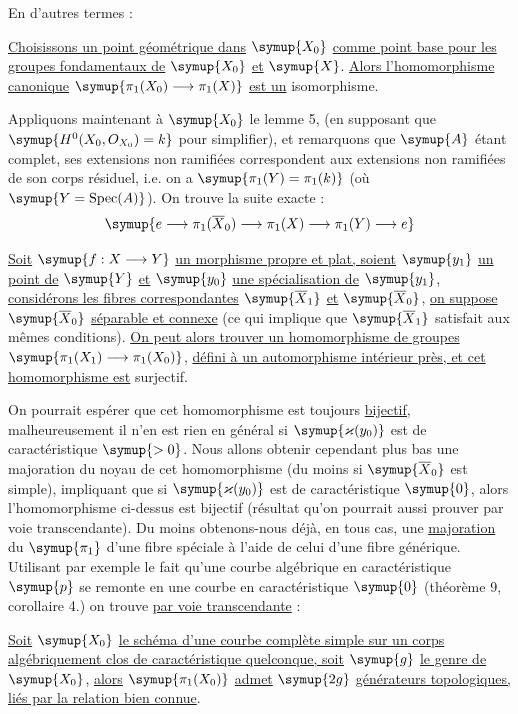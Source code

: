 En d'autres termes :

 \uline{Choisissons un point géométrique dans} $\symup{X_0}$ \uline{comme point
base pour les groupes fondamentaux de} $\symup{X_0}$ \uline{et} $\symup{X}$. \uline{Alors l'homomorphisme
canonique} $\symup{\pi_1(X_0)\longrightarrow\pi_1(X)}$ \uline{est un} isomorphisme.

Appliquons maintenant à $\symup{X_0}$ le lemme 5, (en supposant que
$\symup{H^0(X_0,O_{X_0})=k}$ pour simplifier), et remarquons que $\symup{A}$ étant complet,
ses extensions non ramifiées correspondent aux extensions non ramifiées de son
corps résiduel, i.e. on a $\symup{\pi_1(Y)=\pi_1(k)}$ (où
$\symup{Y=\operatorname{Spec}(A)}$). On trouve la suite exacte :
\[
  \symup{e\longrightarrow\pi_1(\overline X_0)
  \longrightarrow\pi_1(X)\longrightarrow\pi_1(Y)\longrightarrow e}
\]

 \uline{Soit} $\symup{f:X\longrightarrow Y}$ \uline{un morphisme propre et
plat, soient} $\symup{y_1}$ \uline{un point de} $\symup{Y}$ \uline{et} $\symup{y_0}$ \uline{une spécialisation de} $\symup{y_1}$,
\uline{considérons les fibres  correspondantes}
$\symup{\overline X_1}$ \uline{et} $\symup{\overline X_0}$, \uline{on suppose} $\symup{\overline X_0}$ \uline{séparable et
connexe} (ce qui implique que $\symup{\overline X_1}$ satisfait aux mêmes conditions).
\uline{On peut alors trouver un homomorphisme de groupes}
$\symup{\pi_1(X_1)\longrightarrow\pi_1(X_0)}$, \uline{défini à un
automorphisme intérieur près, et cet homomorphisme est} surjectif.

On pourrait espérer que cet homomorphisme est toujours \uline{bijectif,}
malheureusement il n'en est rien en général si $\symup{\varkappa(y_0)}$ est de
caractéristique $\symup{>0}$. Nous allons obtenir cependant plus bas une majoration du
noyau de cet homomorphisme (du moins si $\symup{\overline X_0}$ est simple), impliquant
que si $\symup{\varkappa(y_0)}$ est de caractéristique $\symup{0}$, alors l'homomorphisme
ci-dessus est bijectif (résultat qu'on pourrait aussi prouver par voie
transcendante). Du moins obtenons-nous déjà, en tous cas, une \uline{majoration} du
$\symup{\pi_1}$ d'une fibre spéciale à l'aide de celui d'une fibre générique. Utilisant
par exemple le fait qu'une courbe algébrique en caractéristique $\symup{p}$ se remonte
en une courbe en caractéristique $\symup{0}$ (théorème 9, corollaire 4.) on trouve \uline{par
voie transcendante} :

 \uline{Soit} $\symup{X_0}$ \uline{le schéma d'une courbe complète simple sur
un corps algébriquement clos de caractéristique quelconque, soit} $\symup{g}$ \uline{le genre
de} $\symup{X_0}$, \uline{alors} $\symup{\pi_1(X_0)}$ \uline{admet} $\symup{2g}$ \uline{générateurs topologiques, liés par la
relation bien connue}.

